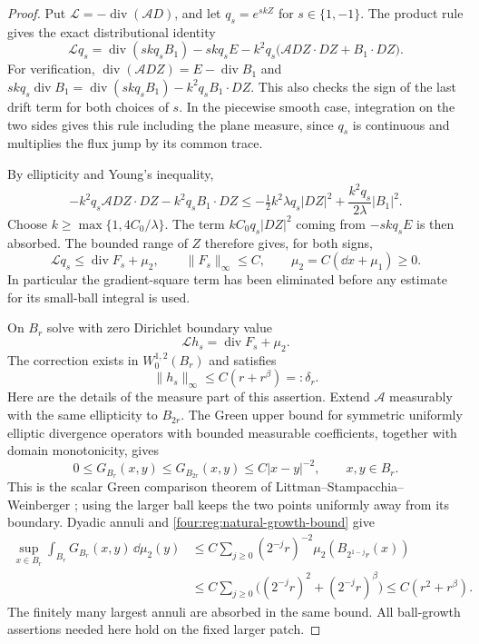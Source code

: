 \begin{proof}
Put $\mathcal L=-\operatorname{div}(\mathcal A D)$, and let
$q_s=e^{skZ}$ for $s\in\{1,-1\}$.  The product rule gives the exact
distributional identity
\begin{equation}\label{four:reg:exponential-identity}
 \mathcal Lq_s
 =\operatorname{div}(skq_sB_1)-skq_sE
    -k^2q_s\bigl(\mathcal A DZ\cdot DZ+B_1\cdot DZ\bigr).
\end{equation}
For verification, $\operatorname{div}(\mathcal A DZ)
=E-\operatorname{div}B_1$ and
$skq_s\operatorname{div}B_1
=\operatorname{div}(skq_sB_1)-k^2q_sB_1\cdot DZ$.
This also checks the sign of the last drift term for both choices
of $s$.  In the piecewise smooth case, integration on the two sides
gives this rule including the plane measure, since $q_s$ is
continuous and multiplies the flux jump by its common trace.

By ellipticity and Young's inequality,
\[
 -k^2q_s\mathcal A DZ\cdot DZ-k^2q_sB_1\cdot DZ
 \le-\tfrac12 k^2\lambda q_s|DZ|^2
                  +\frac{k^2q_s}{2\lambda}|B_1|^2.
\]
Choose $k\ge\max\{1,4C_0/\lambda\}$.  The term
$kC_0q_s|DZ|^2$ coming from $-skq_sE$ is then absorbed.
The bounded range of $Z$ therefore gives, for both signs,
\begin{equation}\label{four:reg:exponential-inequality}
 \mathcal Lq_s\le\operatorname{div}F_s+\mu_2,\qquad
 \|F_s\|_\infty\le C,\qquad
 \mu_2=C(\dd x+\mu_1)\ge0.
\end{equation}
In particular the gradient-square term has been eliminated before
any estimate for its small-ball integral is used.

On $B_r$ solve with zero Dirichlet boundary value
\[
 \mathcal Lh_s=\operatorname{div}F_s+\mu_2.
\]
The correction exists in $W^{1,2}_0(B_r)$ and satisfies
\begin{equation}\label{four:reg:potential-correction}
 \|h_s\|_\infty\le C(r+r^\beta)=:\delta_r.
\end{equation}
Here are the details of the measure part of this assertion.  Extend
$\mathcal A$ measurably with the same ellipticity to $B_{2r}$.
The Green upper bound for symmetric uniformly elliptic divergence
operators with bounded measurable coefficients, together with
domain monotonicity, gives
\[
 0\le G_{B_r}(x,y)\le G_{B_{2r}}(x,y)\le C|x-y|^{-2},
                   \qquad x,y\in B_r.
\]
This is the scalar Green comparison theorem of
Littman--Stampacchia--Weinberger \cite[Theorem~7.1 and Remark~2, p.~66]{LittmanStampacchiaWeinberger1963}; using the larger
ball keeps the two points uniformly away from its boundary.
Dyadic annuli and \eqref{four:reg:natural-growth-bound} give
\begin{align*}
 \sup_{x\in B_r}\int_{B_r}G_{B_r}(x,y)\,\dd\mu_2(y)
 &\le C\sum_{j\ge0}(2^{-j}r)^{-2}
       \mu_2(B_{2^{1-j}r}(x))\\
 &\le C\sum_{j\ge0}
        \bigl((2^{-j}r)^2+(2^{-j}r)^\beta\bigr)
 \le C(r^2+r^\beta).
\end{align*}
The finitely many largest annuli are absorbed in the same bound.
All ball-growth assertions needed here hold on the fixed larger
patch.


\end{proof}
